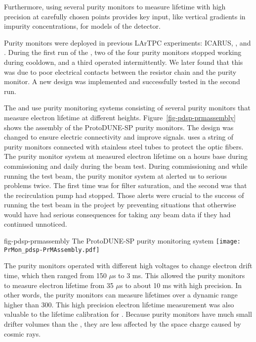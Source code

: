 Furthermore, using several purity monitors to measure lifetime with high precision at carefully chosen points provides key input, like vertical gradients in impurity concentrations, for  models of the detector.

Purity monitors were deployed in previous LArTPC experiments: ICARUS, \microboone, and . During the first run of the , two of the four purity monitors stopped working during cooldown, and a third operated intermittently. We later found that this was due to poor electrical contacts between the resistor chain and the purity monitor. A new design was implemented and successfully tested in the second run. 


The  and  use purity monitoring systems consisting of several purity monitors that measure electron lifetime at different heights. Figure~\ref{fig-pdsp-prmassembly} shows the assembly of the ProtoDUNE-SP  purity monitors. The design was changed to ensure electric connectivity and improve signals.  uses a string of purity monitors connected with stainless steel tubes to protect the optic fibers. The purity monitor system at  measured electron lifetime on a hours base  during commissioning and daily during the beam test. During commissioning and while running the test beam, the purity monitor system at  alerted us to serious problems twice. The first time was for filter saturation, and the second was that the recirculation pump had stopped. Those alerts were crucial to the success of running the test beam in the  project by preventing situations that otherwise would have had serious consequences for taking any beam data if they had continued unnoticed.

\begin{dunefigure}{fig-pdsp-prmassembly}
  {The ProtoDUNE-SP purity monitoring system}
  \texttt{[image: PrMon\_pdsp-PrMAssembly.pdf]}
\end{dunefigure}



The   purity monitors operated with different high voltages to change electron drift time, which then ranged from 150 $\mu$s to 3 ms. This allowed the  purity monitors to measure electron lifetime from 35 $\mu$s to about 10 ms with high precision. In other words, the purity monitors can measure lifetimes over a dynamic range higher than 300. This high precision electron lifetime measurement was also valuable to the lifetime calibration for  . Because purity monitors have much small drifter  volumes than the , they are less affected by the space charge caused by cosmic rays. 

